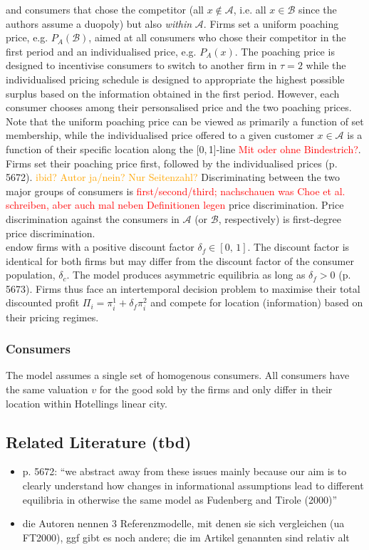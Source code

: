 \documentclass[a4paper, 11 pt, fleqn]{article}
\begin{document}
and consumers that chose the competitor (all $x\notin\mathscr{A}$, i.e. all $x\in\mathscr{B}$ since the authors assume a duopoly) but also
\textit{within} $\mathscr{A}$. Firms set a uniform poaching price, e.g. $P_A(\mathscr{B})$, aimed at all consumers who chose their competitor
in the first period and an individualised price, e.g. $P_A(x)$. The poaching price is designed to incentivise consumers to switch to another
firm in $\tau=2$ while the individualised pricing schedule is designed to appropriate the highest possible surplus based on the information
obtained in the first period.
However, each consumer chooses among their personsalised price and the two poaching prices. Note that the uniform poaching price can be viewed
as primarily a function of set membership, while the individualised price offered to a given customer $x\in\mathscr{A}$ is a function of their
specific location along the [0,\,1]-line \textcolor{red}{Mit oder ohne Bindestrich?}.
Firms set their poaching price first, followed by the individualised prices (p. 5672). \textcolor{orange}{ibid? Autor ja/nein? Nur Seitenzahl?}
Discriminating between the two major groups of consumers is \textcolor{red}{first/second/third; nachschauen was Choe et al. schreiben, aber auch mal neben Definitionen legen}
price discrimination. Price discrimination against the consumers in $\mathscr{A}$ (or $\mathscr{B}$, respectively) is first-degree price discrimination. \\
\citet[p. 5672]{Choe.2018} endow firms with a positive discount factor $\delta_f \in [0,\,1]$. The discount factor is identical for both
firms but may differ from the discount factor of the consumer population, $\delta_c$. The model produces asymmetric equilibria as long as
$\delta_f > 0$ (p. 5673). Firms thus face an intertemporal decision problem to maximise their total discounted profit
$\Pi_i = \pi^1_i + \delta_f\pi^2_i$ and compete for location (information) based on their pricing regimes.
%

%
\subsubsection{Consumers}
The model assumes a single set of homogenous consumers. All consumers have the same valuation $v$ for the good sold by the firms and only 
differ in their location within Hotellings linear city.
%


\subsection{Related Literature (tbd)}
\begin{itemize}
	\item p. 5672: ``we abstract away from these issues mainly because our aim is to clearly understand how changes in informational assumptions lead to different equilibria
	in otherwise the same model as Fudenberg and Tirole (2000)''
	\item die Autoren nennen 3 Referenzmodelle, mit denen sie sich vergleichen (ua FT2000), ggf gibt es noch andere; die im Artikel genannten sind relativ alt
\end{itemize}
%
\end{document}
